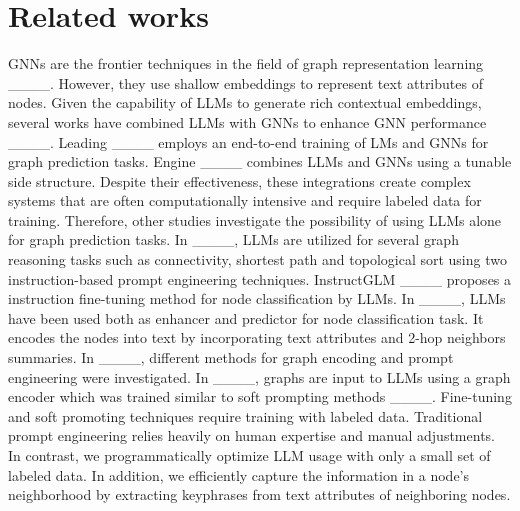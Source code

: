 \section{Related works}
GNNs are the frontier techniques in the field of graph representation learning ____. However, they use shallow embeddings to represent text attributes of nodes. Given the capability of LLMs to generate rich contextual embeddings, several works have combined LLMs with GNNs to enhance GNN performance ____. Leading ____ employs an end-to-end training of LMs and GNNs for graph prediction tasks. Engine ____ combines LLMs and GNNs using a tunable side structure. Despite their effectiveness, these integrations create complex systems that are often computationally intensive and require labeled data for training.
Therefore, other studies investigate the possibility of using LLMs alone for graph prediction tasks. 
In ____, LLMs are utilized for several graph reasoning tasks such as connectivity, shortest path and topological sort using two instruction-based prompt engineering techniques. InstructGLM ____ proposes a instruction fine-tuning method for node classification by LLMs. In ____, LLMs have been used both as enhancer and predictor for node classification task. It encodes the nodes into text by incorporating text attributes and 2-hop neighbors summaries. In ____, different methods for graph encoding and prompt engineering were investigated. In ____, graphs are input to LLMs using a graph encoder which was trained similar to soft prompting methods ____. 
Fine-tuning and soft promoting techniques require training with labeled data. Traditional prompt engineering relies heavily on human expertise and manual adjustments. In contrast, we programmatically optimize LLM usage with only a small set of labeled data. In addition, we efficiently capture the information in a node's neighborhood by extracting keyphrases from text attributes of neighboring nodes. 

